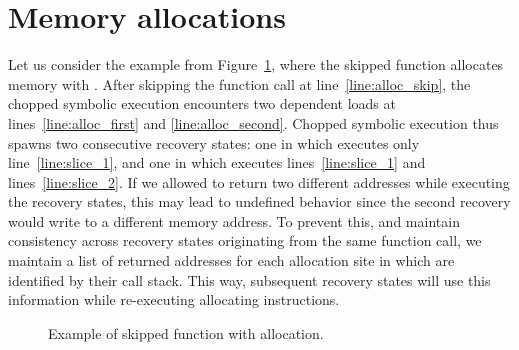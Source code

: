 
\section{Memory allocations}
\label{Se:Malloc}

Let us consider the example from
Figure~\ref{fig:slices-with-allocations}, where the skipped function
 allocates memory with . After skipping the
function call at line~\ref{line:alloc_skip}, the chopped symbolic
execution encounters two dependent loads at
lines~\ref{line:alloc_first} and \ref{line:alloc_second}. Chopped
symbolic execution thus spawns two consecutive recovery states: one in
which executes only line~\ref{line:slice_1}, and one in which executes lines~\ref{line:slice_1} and
lines~\ref{line:slice_2}. If we allowed  to return two different addresses while
executing the recovery states, this may lead to undefined behavior
since the second recovery would write to a different memory
address. To prevent this, and maintain consistency across recovery
states originating from the same function call, we maintain a list of
returned addresses for each allocation site in  which are
identified by their call stack. This way, subsequent recovery states
will use this information while re-executing allocating instructions.

\begin{figure}[tbp]
  \vspace{-2mm}
  \caption{Example of skipped function with allocation.}\vspace{-4mm}
\label{fig:slices-with-allocations}
\end{figure}


